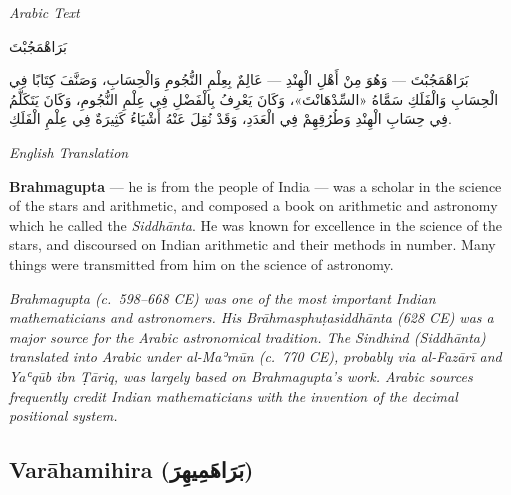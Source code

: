 \documentclass[11pt,a4paper]{article}
\def\RL#1{\beginR#1\endR}
\newcommand{\cnote}[1]{\textcolor{notecolor}{\textit{#1}}}
\newcommand{\textarabic}[1]{{\arabicfont\RL{#1}}}
\newenvironment{arabiccol}{%
  \begin{minipage}[t]{0.48\textwidth}%
  \begin{tcolorbox}[colback=leftbg,colframe=rulecolor,boxrule=0.4pt,arc=2pt,left=5pt,right=5pt,top=5pt,bottom=5pt]%
  \centering\textit{\footnotesize Arabic Text}\\[0.4em]%
  \raggedright\arabicfont\small%
}{%
  \end{tcolorbox}%
  \end{minipage}%
}
\newenvironment{englishcol}{%
  \begin{minipage}[t]{0.48\textwidth}%
  \begin{tcolorbox}[colback=rightbg,colframe=rulecolor,boxrule=0.4pt,arc=2pt,left=5pt,right=5pt,top=5pt,bottom=5pt]%
  \centering\textit{\footnotesize English Translation}\\[0.4em]%
  \raggedright\small%
}{%
  \end{tcolorbox}%
  \end{minipage}%
}
\begin{document}
\noindent
\begin{arabiccol}
\beginR
بَرَاهْمَجُبْتَ

بَرَاهْمَجُبْتَ — وَهُوَ مِنْ أَهْلِ الْهِنْدِ — عَالِمٌ بِعِلْمِ النُّجُومِ وَالْحِسَابِ، وَصَنَّفَ كِتَابًا فِي الْحِسَابِ وَالْفَلَكِ سَمَّاهُ «السِّدْهَانْتَ»، وَكَانَ يَعْرِفُ بِالْفَضْلِ فِي عِلْمِ النُّجُومِ، وَكَانَ يَتَكَلَّمُ فِي حِسَابِ الْهِنْدِ وَطُرُقِهِمْ فِي الْعَدَدِ، وَقَدْ نُقِلَ عَنْهُ أَشْيَاءُ كَثِيرَةٌ فِي عِلْمِ الْفَلَكِ.
\endR
\end{arabiccol}
\hfill
\begin{englishcol}
\textbf{Brahmagupta} --- he is from the people of India --- was a scholar in the science of the stars and arithmetic, and composed a book on arithmetic and astronomy which he called the \textit{Siddhānta}. He was known for excellence in the science of the stars, and discoursed on Indian arithmetic and their methods in number. Many things were transmitted from him on the science of astronomy.

\cnote{Brahmagupta (c.~598--668 CE) was one of the most important Indian mathematicians and astronomers. His \textit{Brāhmasphuṭasiddhānta} (628 CE) was a major source for the Arabic astronomical tradition. The \textit{Sindhind} (\textit{Siddhānta}) translated into Arabic under al-Maʾmūn (c.~770 CE), probably via al-Fazārī and Yaʿqūb ibn Ṭāriq, was largely based on Brahmagupta's work. Arabic sources frequently credit Indian mathematicians with the invention of the decimal positional system.}
\end{englishcol}

\par\vspace{0.5em}

\subsection{Varāhamihira (\textarabic{بَرَاهَمِيهِرَ})}
\end{document}
